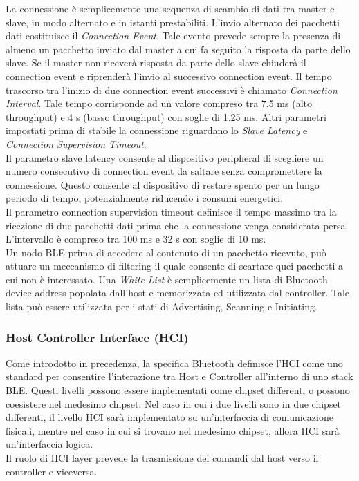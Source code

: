 \noindent La connessione è semplicemente una sequenza di scambio di dati tra master e slave, in modo alternato e in istanti prestabiliti. L'invio alternato dei pacchetti dati costituisce il \textit{Connection Event}. Tale evento prevede sempre la presenza di almeno un pacchetto inviato dal master a cui fa seguito la risposta da parte dello slave. Se il master non riceverà risposta da parte dello slave chiuderà il connection event e riprenderà l'invio al successivo connection event. Il tempo trascorso tra l'inizio di due connection event successivi è chiamato \textit{Connection Interval}. Tale tempo corrisponde ad un valore compreso tra 7.5 ms (alto throughput) e 4 s (basso throughput) con soglie di 1.25 ms. Altri parametri impostati prima di stabile la connessione riguardano lo \textit{Slave Latency} e \textit{Connection Supervision Timeout}.\\
Il parametro slave latency consente al dispositivo peripheral di scegliere un numero consecutivo di connection event da saltare senza compromettere la connessione. Questo consente al dispositivo di restare spento per un lungo periodo di tempo, potenzialmente riducendo i consumi energetici.\\
Il parametro connection supervision timeout definisce il tempo massimo tra la ricezione di due pacchetti dati prima che la connessione venga considerata persa. L'intervallo è compreso tra 100 ms e 32 s con soglie di 10 ms.\\

\noindent Un nodo BLE prima di accedere al contenuto di un pacchetto ricevuto, può attuare un meccanismo di filtering il quale consente di scartare quei pacchetti a cui non è interessato. Una \textit{White List} è semplicemente un lista di Bluetooth device address popolata dall'host e memorizzata ed utilizzata dal controller. Tale lista può essere utilizzata per i stati di Advertising, Scanning e Initiating.


\subsubsection{Host Controller Interface (HCI)}
Come introdotto in precedenza, la specifica Bluetooth definisce l'HCI come uno standard per consentire l'interazione tra Host e Controller all'interno di uno stack BLE. Questi livelli possono essere implementati come chipset differenti o possono coesistere nel medesimo chipset. Nel caso in cui i due livelli sono in due chipset differenti, il livello HCI sarà implementato su un'interfaccia di comunicazione fisica.ì, mentre nel caso in cui si trovano nel medesimo chipset, allora HCI sarà un'interfaccia logica.\\
Il ruolo di HCI layer prevede la trasmissione dei comandi dal host verso il controller e viceversa.

